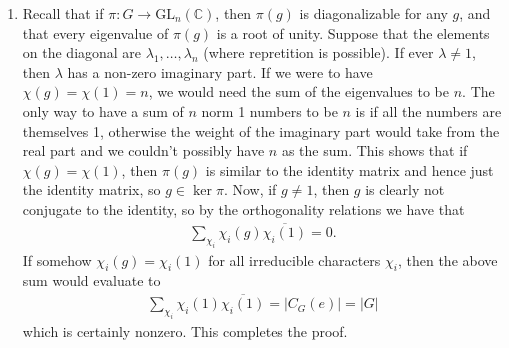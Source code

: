 \documentclass[12pt]{article}
\theoremstyle{definitionstyle}
\def\mbb#1{\mathbb{#1}}
\def\C{\mbb{C}}
\newcommand{\GL}{\mathrm{GL}}
\begin{document}
\begin{enumerate}
        \item Recall that if $\pi: G \to \GL_n(\C)$, then $\pi(g)$ is diagonalizable for any $g$, and that every eigenvalue of $\pi(g)$ is a root of unity. Suppose that the elements on the diagonal are $\lambda_1, \ldots, \lambda_n$ (where repretition is possible). If ever $\lambda \neq 1$, then $\lambda$ has a non-zero imaginary part. If we were to have $\chi(g) = \chi(1) = n$, we would need the sum of the eigenvalues to be $n$. The only way to have a sum of $n$ norm 1 numbers to be $n$ is if all the numbers are themselves 1, otherwise the weight of the imaginary part would take from the real part and we couldn't possibly have $n$ as the sum. This shows that if $\chi(g) = \chi(1)$, then $\pi(g)$ is similar to the identity matrix and hence just the identity matrix, so $g \in \ker \pi$. Now, if $g \neq 1$, then $g$ is clearly not conjugate to the identity, so by the orthogonality relations we have that
        \begin{align*}
            \sum_{\chi_i} \chi_i(g) \overline{\chi_i(1)} = 0.
        \end{align*}
        If somehow $\chi_i(g) = \chi_i(1)$ for all irreducible characters $\chi_i$, then the above sum would evaluate to
        \begin{align*}
            \sum_{\chi_i} \chi_i(1) \overline{\chi_i(1)} = |C_G(e)| = |G|
        \end{align*}
        which is certainly nonzero. This completes the proof.


\end{enumerate}
\end{document}
